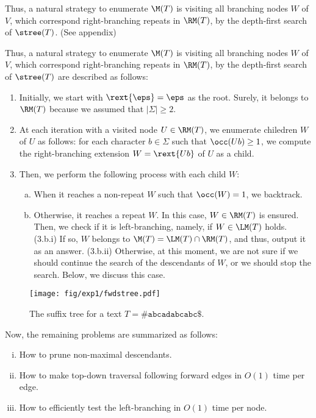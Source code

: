 Thus, a natural strategy to enumerate $\M(T)$ is visiting all branching nodes $W$ of $V$, which correspond right-branching repeats in $\RM(T)$, by the depth-first search of $\stree(T)$. (See appendix)

\begin{toappendix}    
Thus, a natural strategy to enumerate $\M(T)$ is visiting all branching nodes $W$ of $V$, which correspond right-branching repeats in $\RM(T)$, by the depth-first search of $\stree(T)$ are described as follows:
\begin{enumerate}[(1)]
\item Initially, we start with $\rext{\eps} = \eps$ as the root. Surely, it belongs to $\RM(T)$ because we assumed that $|\Sigma|\ge 2$. 
\item At each iteration with a visited node $U\in \RM(T)$, we enumerate chiledren $W$ of $U$ as follows: for each character $b \in \Sigma$ such that $\occ(Ub) \ge 1$, we compute the right-branching extension $W = \rext{Ub}$ of $U$ as a child. 

\item Then, we perform the following process with each child $W$:
  \begin{enumerate}[(a)]
\item When it reaches a non-repeat $W$ such that $\occ(W) = 1$, we backtrack.
\item Otherwise, it reaches a repeat $W$. In this case, $W \in \RM(T)$ is ensured.
  Then, we check if it is left-branching, namely, if $W \in \LM(T)$ holds.
  (3.b.i) If so, $W$ belongs to $\M(T) = \LM(T)\cap \RM(T)$, and thus, output it as an answer.
  (3.b.ii) Otherwise, at this moment, we are not sure if we should continue the search of the descendants of $W$, or we should stop the search. Below, we discuss this case. 
  \end{enumerate}
\end{enumerate}
\end{toappendix}


\begin{figure}[t]
\centering  
  \texttt{[image: fig/exp1/fwdstree.pdf]}
  \caption{The suffix tree for a text $T = \mathtt{\#abcadabcabc\$}$.}\label{fig:fwdstree}
\end{figure}

Now, the remaining problems are summarized as follows:
\begin{enumerate}[(i)]
\item How to prune non-maximal descendants. 

\item How to make top-down traversal following forward edges in $O(1)$ time per edge. 

\item How to efficiently test the left-branching in $O(1)$ time per node. 
\end{enumerate}

